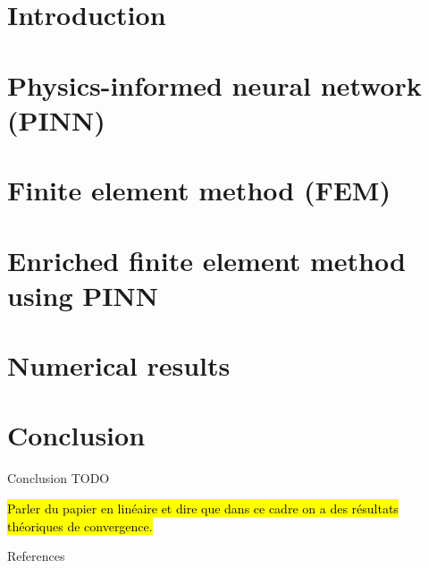 \documentclass[compress,10pt,xcolor={table,dvipsnames},t]{beamer} %
\newcommand{\insertsectionheadSubtitle}{}
\begin{document}
	\section*{Introduction}
	

	
	\renewcommand{\insertsectionheadSubtitle}{The PINN is parametrized by the $\bm{\mu}$ parameter.}
	\section{Physics-informed neural network (PINN)}
	
	\renewcommand{\insertsectionheadSubtitle}{}

	\renewcommand{\insertsectionheadSubtitle}{The $\bm{\mu}$ parameter is fixed in the FE resolution.}
	\section{Finite element method (FEM)}
	
	\renewcommand{\insertsectionheadSubtitle}{}

	\section{Enriched finite element method using PINN}
	

	\section{Numerical results}
	

	\section*{Conclusion}

	\begin{frame}{Conclusion}
		TODO

		\hl{Parler du papier en linéaire et dire que dans ce cadre on a des résultats théoriques de convergence.}
	\end{frame}

	\BackgroundBiblio
	
	{ 	
	\begin{frame}{References}
		\scriptsize
		
	\end{frame}
	}
	\addtocounter{framenumber}{-1} 
	
	\Background

	
	\appendix
	
	
	
\end{document}
